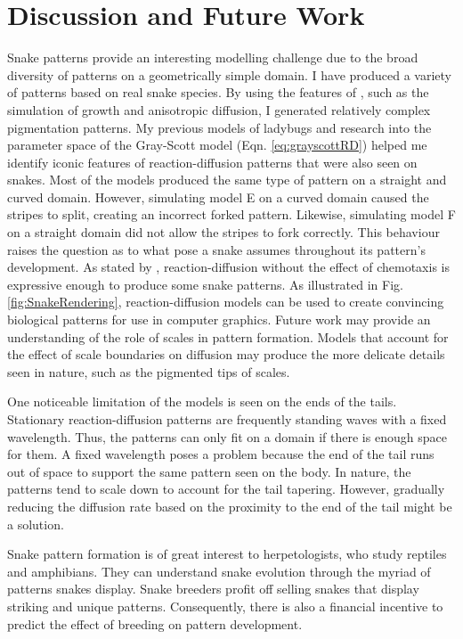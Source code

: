 \newpage

\section{Discussion and Future Work}
Snake patterns provide an interesting modelling challenge due to the broad diversity of patterns on a geometrically simple domain. I have produced a variety of patterns based on real snake species. By using the features of \ProgramName{}, such as the simulation of growth and anisotropic diffusion, I generated relatively complex pigmentation patterns. My previous models of ladybugs and research into the parameter space of the Gray-Scott model (Eqn. \ref{eq:grayscottRD}) helped me identify iconic features of reaction-diffusion patterns that were also seen on snakes. Most of the models produced the same type of pattern on a straight and curved domain. However, simulating model E on a curved domain caused the stripes to split, creating an incorrect forked pattern. Likewise, simulating model F on a straight domain did not allow the stripes to fork correctly. This behaviour raises the question as to what pose a snake assumes throughout its pattern's development. As stated by \citet{murray1991}, reaction-diffusion without the effect of chemotaxis is expressive enough to produce some snake patterns. As illustrated in Fig. \ref{fig:SnakeRendering}, reaction-diffusion models can be used to create convincing biological patterns for use in computer graphics. Future work may provide an understanding of the role of scales in pattern formation. Models that account for the effect of scale boundaries on diffusion may produce the more delicate details seen in nature, such as the pigmented tips of scales. 

One noticeable limitation of the models is seen on the ends of the tails. Stationary reaction-diffusion patterns are frequently standing waves with a fixed wavelength. Thus, the patterns can only fit on a domain if there is enough space for them. A  fixed wavelength poses a problem because the end of the tail runs out of space to support the same pattern seen on the body. In nature, the patterns tend to scale down to account for the tail tapering. However, gradually reducing the diffusion rate based on the proximity to the end of the tail might be a solution.

Snake pattern formation is of great interest to herpetologists, who study reptiles and amphibians. They can understand snake evolution through the myriad of patterns snakes display. Snake breeders profit off selling snakes that display striking and unique patterns. Consequently, there is also a financial incentive to predict the effect of breeding on pattern development.


